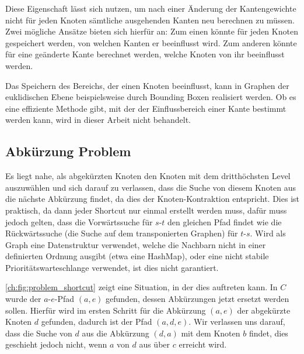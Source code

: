 Diese Eigenschaft lässt sich nutzen, um nach einer Änderung der Kantengewichte nicht für jeden Knoten sämtliche ausgehenden Kanten neu berechnen zu müssen.
Zwei mögliche Ansätze bieten sich hierfür an:
Zum einen könnte für jeden Knoten gespeichert werden, von welchen Kanten er beeinflusst wird.
Zum anderen könnte für eine geänderte Kante berechnet werden, welche Knoten von ihr beeinflusst werden.

Das Speichern des Bereichs, der einen Knoten beeinflusst, kann in Graphen der euklidischen Ebene beispielsweise durch Bounding Boxen realisiert werden. Ob es eine effiziente Methode gibt, mit der der Einflussbereich einer Kante bestimmt werden kann, wird in dieser Arbeit nicht behandelt.

\subsection{Abkürzung Problem}

Es liegt nahe, als abgekürzten Knoten den Knoten mit dem dritthöchsten Level auszuwählen und sich darauf zu verlassen, dass die Suche von diesem Knoten aus die nächste Abkürzung findet, da dies der Knoten-Kontraktion entspricht.
Dies ist praktisch, da dann jeder Shortcut nur einmal erstellt werden muss, dafür muss jedoch gelten, dass die Vorwärtssuche für $s$-$t$ den gleichen Pfad findet wie die Rückwärtssuche (die Suche auf dem transponierten Graphen) für $t$-$s$.
Wird als Graph eine Datenstruktur verwendet, welche die Nachbarn nicht in einer definierten Ordnung ausgibt (etwa eine HashMap), oder eine nicht stabile Prioritätswarteschlange verwendet, ist dies nicht garantiert.

\autoref{ch:fig:problem_shortcut} zeigt eine Situation, in der dies auftreten kann.
In $C$ wurde der $a$-$e$-Pfad $(a, e)$ gefunden, dessen Abkürzungen jetzt ersetzt werden sollen.
Hierfür wird im ersten Schritt für die Abkürzung $(a, e)$ der abgekürzte Knoten $d$ gefunden, dadurch ist der Pfad $(a, d, e)$.
Wir verlassen uns darauf, dass die Suche von $d$ aus die Abkürzung $(d, a)$ mit dem Knoten $b$ findet, dies geschieht jedoch nicht, wenn $a$ von $d$ aus über $c$ erreicht wird.

